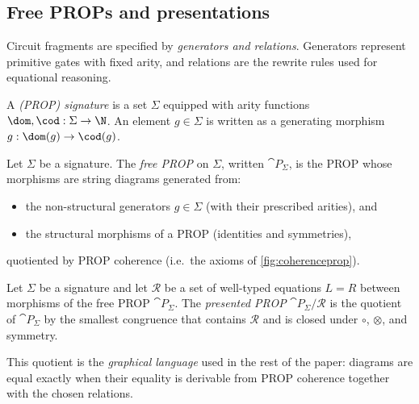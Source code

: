 \subsection{Free PROPs and presentations}\label{free-prop}

Circuit fragments are specified by \emph{generators and relations}.  Generators represent primitive
gates with fixed arity, and relations are the rewrite rules used for equational reasoning.

\begin{definition}\label{def:signature}
A \emph{(PROP) signature} is a set \(\Sigma\) equipped with arity functions
\(\dom,\cod:\Sigma\to\N\).
An element \(g\in\Sigma\) is written as a generating morphism \(g:\dom(g)\to\cod(g)\).
\end{definition}

\begin{definition}\label{def:free-prop}
Let \(\Sigma\) be a signature.  The \emph{free PROP} on \(\Sigma\), written \(\cat{P}_\Sigma\), is the
PROP whose morphisms are string diagrams generated from:
\begin{itemize}
\item the non-structural generators \(g\in\Sigma\) (with their prescribed arities), and
\item the structural morphisms of a PROP (identities and symmetries),
\end{itemize}
quotiented by PROP coherence (i.e.\ the axioms of \cref{fig:coherenceprop}).
\end{definition}

\begin{definition}\label{def:presented-prop}
Let \(\Sigma\) be a signature and let \(\mathcal{R}\) be a set of well-typed equations
\(L=R\) between morphisms of the free PROP \(\cat{P}_\Sigma\).
The \emph{presented PROP} \(\cat{P}_\Sigma/\mathcal{R}\) is the quotient of \(\cat{P}_\Sigma\)
by the smallest congruence that contains \(\mathcal{R}\) and is closed under \(\circ\), \(\otimes\),
and symmetry.
\end{definition}

This quotient is the \emph{graphical language} used in the rest of the paper: diagrams are equal exactly when their
equality is derivable from PROP coherence together with the chosen relations.


